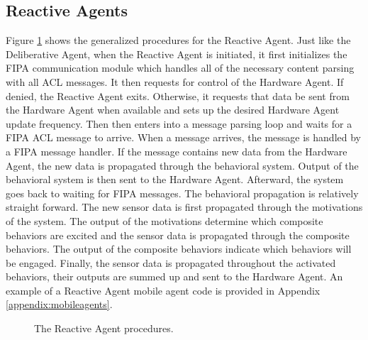     \subsection{Reactive Agents}
      Figure \ref{fig:reactiveprocedures} shows the generalized procedures
        for the Reactive Agent.
      Just like the Deliberative Agent, when the Reactive Agent is initiated,
        it first initializes the FIPA communication module which handles all of 
        the necessary content parsing with all ACL messages.
      It then requests for control of the Hardware Agent.
      If denied, the Reactive Agent exits.
      Otherwise, it requests that data be sent from the Hardware Agent when
        available and sets up the desired Hardware Agent update frequency.
      Then then enters into a message parsing loop and waits for a FIPA ACL
        message to arrive.
      When a message arrives, the message is handled by a FIPA message handler.
      If the message contains new data from the Hardware Agent, the new data
        is propagated through the behavioral system.
      Output of the behavioral system is then sent to the Hardware Agent.
      Afterward, the system goes back to waiting for FIPA messages.
      The behavioral propagation is relatively straight forward.
      The new sensor data is first propagated through the motivations of the
        system.
      The output of the motivations determine which composite behaviors are
        excited and the sensor data is propagated through the composite 
        behaviors.
      The output of the composite behaviors indicate which behaviors will be 
        engaged.
      Finally, the sensor data is propagated throughout the activated behaviors, 
        their outputs are summed up and sent to the Hardware Agent.
      An example of a Reactive Agent mobile agent code is provided in Appendix 
        \ref{appendix:mobileagents}.
      \begin{figure}%
      \centerline{
      }
      \caption{The Reactive Agent procedures.}
      \label{fig:reactiveprocedures}
      \end{figure}
 
